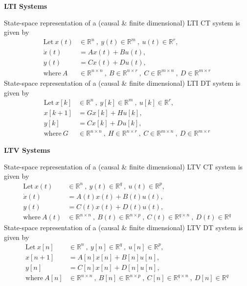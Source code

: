 \documentclass[twoside]{article}
\begin{document}
\textbf{LTI Systems}

State-space representation of a (causal \& finite dimensional) LTI CT system is given by
%
\begin{align*}
  \mathrm{Let} \ x(t) &\in \mathbb{R}^n \ , \ y(t) \in \mathbb{R}^m \ ,\  u(t) \in
  \mathbb{R}^r , \\
  \dot{x}(t) &= A x(t) + B u(t) , \\
  y(t) &= C x(t) + D u(t) , \\
  \mathrm{where} \ A &\in \mathbb{R}^{n \times n} \ , \ 
    B \in \mathbb{R}^{n \times r} \ ,\  C \in \mathbb{R}^{m \times n} \ , \ D \in \mathbb{R}^{m \times r}
\end{align*}
%
State-space representation of a (causal \& finite dimensional) LTI DT system is given by
%
\begin{align*}
  \mathrm{Let} \ x[k] &\in \mathbb{R}^n \ , \ y[k] \in \mathbb{R}^m \ ,\  u[k] \in
  \mathbb{R}^r , \\
  x[k+1] &= G x[k] + H u[k] , \\
  y[k] &= C x[k] + D u[k] , \\
  \mathrm{where} \ G &\in \mathbb{R}^{n \times n} \ , \ 
    H \in \mathbb{R}^{n \times r} \ ,\  C \in \mathbb{R}^{m \times n} \ , \ D \in \mathbb{R}^{m \times r}
\end{align*}
%

\textbf{LTV Systems}

State-space representation of a (causal \& finite dimensional) LTV CT system is given by
%
\begin{align*}
  \mathrm{Let} \ x(t) &\in \mathbb{R}^n \ , \ y(t) \in \mathbb{R}^q \ ,\  u(t) \in
  \mathbb{R}^p , \\
  \dot{x}(t) &= A(t) x(t) + B(t) u(t) , \\
  y(t) &= C(t) x(t) + D(t) u(t) , \\
  \mathrm{where} \ A(t) &\in \mathbb{R}^{n \times n} \ , \ 
    B(t) \in \mathbb{R}^{n \times p} \ ,\  C(t) \in \mathbb{R}^{q \times n} \ , \ D(t) \in \mathbb{R}^q
\end{align*}
%
State-space representation of a (causal \& finite dimensional) LTV DT system is given by
%
\begin{align*}
  \mathrm{Let} \ x[n] &\in \mathbb{R}^n \ , \ y[n] \in \mathbb{R}^q \ ,\  u[n] \in
  \mathbb{R}^p , \\
  x[n+1] &= A[n] x[n] + B[n] u[n] , \\
  y[n] &= C[n] x[n] + D[n] u[n] , \\
  \mathrm{where} \ A[n] &\in \mathbb{R}^{n \times n} \ , \ 
    B[n] \in \mathbb{R}^{n \times p} \ ,\  C[n] \in \mathbb{R}^{q
                          \times  n} \ , \ D[n] \in \mathbb{R}^q
\end{align*}
\end{document}
